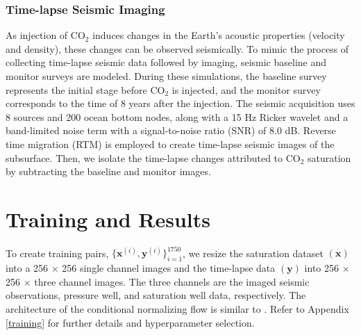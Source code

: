 \documentclass{article}
\begin{document}
\subsubsection{Time-lapse Seismic Imaging}
%
As injection of CO${_2}$ induces changes in the Earth's acoustic properties (velocity and density), these changes can be observed seismically. To mimic the process of collecting time-lapse seismic data followed by imaging, seismic baseline and monitor surveys are modeled. During these simulations, the baseline survey represents the initial stage before CO${_2}$ is injected, and the monitor survey corresponds to the time of 8 years after the injection. The seismic acquisition uses 8 sources and 200 ocean bottom nodes, along with a 15 Hz Ricker wavelet and a band-limited noise term with a signal-to-noise ratio (SNR) of 8.0 dB. Reverse time migration (RTM) \cite{doi:10.1190/1.1441434} is employed to create time-lapse seismic images of the subsurface. Then, we isolate the time-lapse changes attributed to CO${_2}$ saturation by subtracting the baseline and monitor images.
%
\section{Training and Results}
%
To create training pairs, $\{ \mathbf{x}^{(i)}, \mathbf{y}^{(i)} \}_{i=1}^{1750}$, we resize the saturation dataset $(\mathbf{x})$ into a 256 $\times$ 256 single channel images and the time-lapse data $(\mathbf{y})$ into 256 $\times$ 256 $\times$ three channel images. The three channels are the imaged seismic observations, pressure well, and saturation well data, respectively. The architecture of the conditional normalizing flow is similar to \cite{cnf}. Refer to Appendix \ref{training} for further details and hyperparameter selection.
\end{document}
